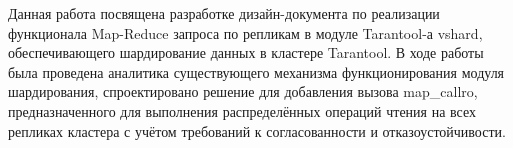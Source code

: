 \abstract

Данная работа посвящена разработке дизайн-документа по реализации функционала
Map-Reduce запроса по репликам в модуле Tarantool-а vshard, обеспечивающего
шардирование данных в кластере Tarantool. В ходе работы была проведена
аналитика существующего механизма функционирования модуля шардирования,
спроектировано решение для добавления вызова map_callro, предназначенного для
выполнения распределённых операций чтения на всех репликах кластера с учётом
требований к согласованности и отказоустойчивости.
